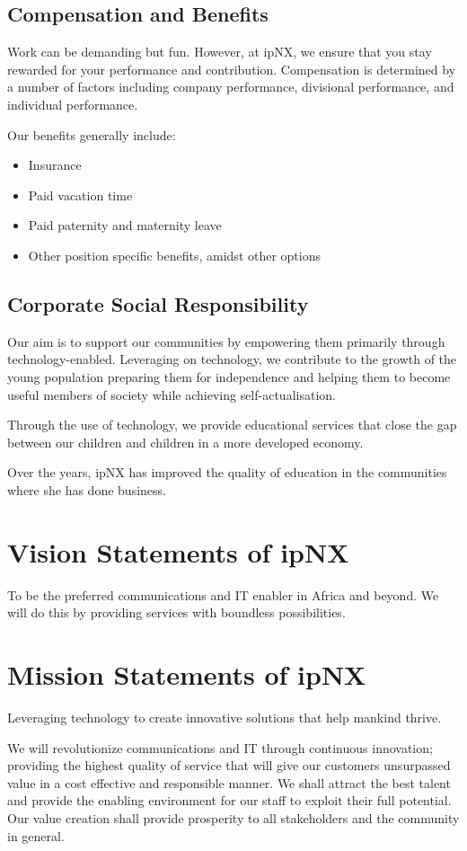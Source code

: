 \subsection{Compensation and Benefits}
Work can be demanding but fun. However, at ipNX, we ensure that you stay rewarded for your performance and contribution. Compensation is determined by a number of factors including company performance, divisional performance, and individual performance.

Our benefits generally include:
\begin{itemize}
	\item Insurance
	\item Paid vacation time
	\item Paid paternity and maternity leave
	\item Other position specific benefits, amidst other options
\end{itemize}
\subsection{Corporate Social Responsibility}
Our aim is to support our communities by empowering them primarily through technology-enabled. Leveraging on technology, we contribute to the growth of the young population preparing them for independence and helping them to become useful members of society while achieving self-actualisation.

Through the use of technology, we provide educational services that close the gap between our children and children in a more developed economy.

Over the years, ipNX has improved the quality of education in the communities where she has done business.
\section{Vision Statements of ipNX}
To be the preferred communications and IT enabler in Africa and beyond. We will do this by providing services with boundless possibilities.
\section{Mission Statements of ipNX}
Leveraging technology to create innovative solutions that help mankind thrive.

We will revolutionize communications and IT through continuous innovation; providing the highest quality of service that will give our customers unsurpassed value in a cost effective and responsible manner.
We shall attract the best talent and provide the enabling environment for our staff to exploit their full potential.
Our value creation shall provide prosperity to all stakeholders and the community in general.
